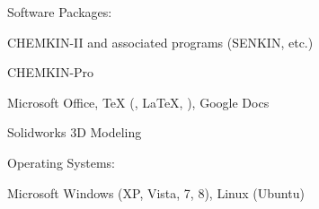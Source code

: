 \halfblankline

Software Packages:
%
\begin{innerlist}
    \item CHEMKIN-II and associated programs (SENKIN, etc.)
    \item CHEMKIN-Pro
    \item Microsoft Office, \TeX{} (\XeLaTeX{}, \LaTeX{}, \BibTeX{}),
          Google Docs
    \item Solidworks 3D Modeling
\end{innerlist}

\halfblankline

Operating Systems:
%
\begin{innerlist}
    \item Microsoft Windows (XP, Vista, 7, 8), Linux (Ubuntu)
\end{innerlist}





